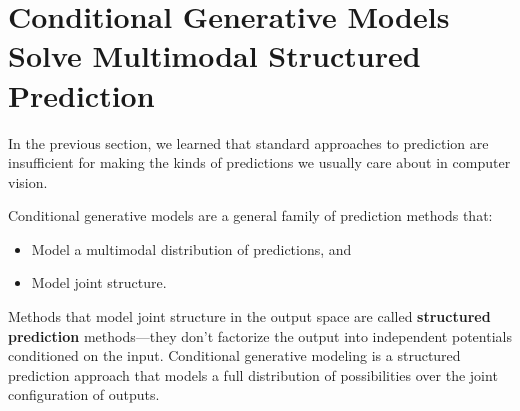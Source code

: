 

\section{Conditional Generative Models Solve Multimodal Structured Prediction}


In the previous section, we learned that standard approaches to prediction are insufficient for making the kinds of predictions we usually care about in computer vision.

Conditional generative models are a general family of prediction methods that:
\begin{itemize}
    \item Model a multimodal distribution of predictions, and
    \item Model joint structure.
\end{itemize}

Methods that model joint structure in the output space are called \textbf{structured prediction} methods—they don't factorize the output into independent potentials conditioned on the input. Conditional generative modeling is a structured prediction approach that models a full distribution of possibilities over the joint configuration of outputs.

